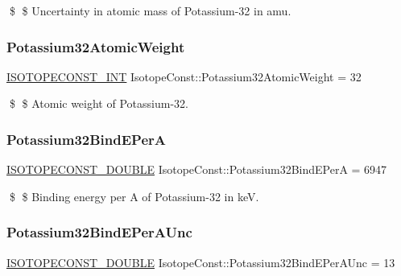 \$ \$ Uncertainty in atomic mass of Potassium-\/32 in amu. \mbox{\label{group___isotope_const-_potassium-_k32_ga69a585aa666d6c71f9fe7eac17d3f2c4}} 
\subsubsection{\texorpdfstring{Potassium32\+Atomic\+Weight}{Potassium32AtomicWeight}}
{\footnotesize\ttfamily \mbox{\hyperlink{group___isotope_const-_macros_ga5f18360b3e99483a35c32d789e62621c}{I\+S\+O\+T\+O\+P\+E\+C\+O\+N\+S\+T\+\_\+\+I\+NT}} Isotope\+Const\+::\+Potassium32\+Atomic\+Weight = 32}

\$ \$ Atomic weight of Potassium-\/32. \mbox{\label{group___isotope_const-_potassium-_k32_ga38236b201c56fa651d0a1ce3a4c424d1}} 
\subsubsection{\texorpdfstring{Potassium32\+Bind\+E\+PerA}{Potassium32BindEPerA}}
{\footnotesize\ttfamily \mbox{\hyperlink{group___isotope_const-_macros_ga8f45a7272ce02c0b4c65c44636ed719a}{I\+S\+O\+T\+O\+P\+E\+C\+O\+N\+S\+T\+\_\+\+D\+O\+U\+B\+LE}} Isotope\+Const\+::\+Potassium32\+Bind\+E\+PerA = 6947}

\$ \$ Binding energy per A of Potassium-\/32 in keV. \mbox{\label{group___isotope_const-_potassium-_k32_gaebf0153c037eafa494a66f60e3c0528e}} 
\subsubsection{\texorpdfstring{Potassium32\+Bind\+E\+Per\+A\+Unc}{Potassium32BindEPerAUnc}}
{\footnotesize\ttfamily \mbox{\hyperlink{group___isotope_const-_macros_ga8f45a7272ce02c0b4c65c44636ed719a}{I\+S\+O\+T\+O\+P\+E\+C\+O\+N\+S\+T\+\_\+\+D\+O\+U\+B\+LE}} Isotope\+Const\+::\+Potassium32\+Bind\+E\+Per\+A\+Unc = 13}

